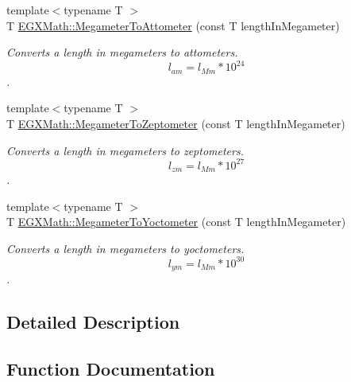 \begin{DoxyCompactItemize}
{\footnotesize template$<$typename T $>$ }\\T \mbox{\hyperlink{group___e_g_x_math-_conversions-_length_conversions-_megameter-_s_i_ga13016f40e740def54199de991815f422}{E\+G\+X\+Math\+::\+Megameter\+To\+Attometer}} (const T length\+In\+Megameter)
\begin{DoxyCompactList}\small\item\em Converts a length in megameters to attometers. \[ l_{am}=l_{Mm} * 10^{24} \]. \end{DoxyCompactList}\item 
{\footnotesize template$<$typename T $>$ }\\T \mbox{\hyperlink{group___e_g_x_math-_conversions-_length_conversions-_megameter-_s_i_ga38fee336ea865f1f7ec6541c2256a8fe}{E\+G\+X\+Math\+::\+Megameter\+To\+Zeptometer}} (const T length\+In\+Megameter)
\begin{DoxyCompactList}\small\item\em Converts a length in megameters to zeptometers. \[ l_{zm}=l_{Mm} * 10^{27} \]. \end{DoxyCompactList}\item 
{\footnotesize template$<$typename T $>$ }\\T \mbox{\hyperlink{group___e_g_x_math-_conversions-_length_conversions-_megameter-_s_i_gac9b71989abb5a622818f01c5bdbe7285}{E\+G\+X\+Math\+::\+Megameter\+To\+Yoctometer}} (const T length\+In\+Megameter)
\begin{DoxyCompactList}\small\item\em Converts a length in megameters to yoctometers. \[ l_{ym}=l_{Mm} * 10^{30} \]. \end{DoxyCompactList}\end{DoxyCompactItemize}


\subsection{Detailed Description}


\subsection{Function Documentation}
\mbox{\label{group___e_g_x_math-_conversions-_length_conversions-_megameter-_s_i_ga13016f40e740def54199de991815f422}} 
